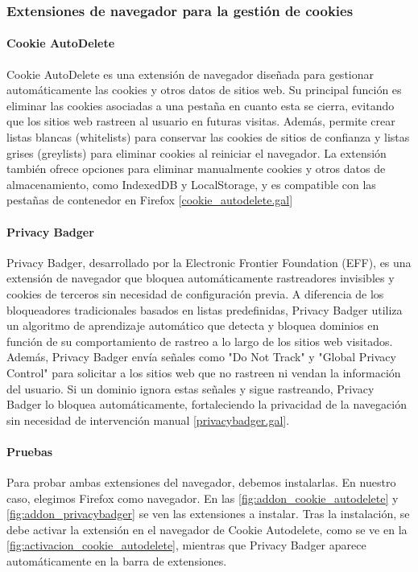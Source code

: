 \subsubsection{Extensiones de navegador para la gestión de cookies}

\paragraph{Cookie AutoDelete}

Cookie AutoDelete es una extensión de navegador diseñada para gestionar automáticamente las cookies y otros datos de sitios web. Su principal función es eliminar las cookies asociadas a una pestaña en cuanto esta se cierra, evitando que los sitios web rastreen al usuario en futuras visitas. Además, permite crear listas blancas (whitelists) para conservar las cookies de sitios de confianza y listas grises (greylists) para eliminar cookies al reiniciar el navegador. La extensión también ofrece opciones para eliminar manualmente cookies y otros datos de almacenamiento, como IndexedDB y LocalStorage, y es compatible con las pestañas de contenedor en Firefox [\url{cookie_autodelete.gal}]

\paragraph{Privacy Badger}

Privacy Badger, desarrollado por la Electronic Frontier Foundation (EFF), es una extensión de navegador que bloquea automáticamente rastreadores invisibles y cookies de terceros sin necesidad de configuración previa. A diferencia de los bloqueadores tradicionales basados en listas predefinidas, Privacy Badger utiliza un algoritmo de aprendizaje automático que detecta y bloquea dominios en función de su comportamiento de rastreo a lo largo de los sitios web visitados. Además, Privacy Badger envía señales como "Do Not Track" y "Global Privacy Control" para solicitar a los sitios web que no rastreen ni vendan la información del usuario. Si un dominio ignora estas señales y sigue rastreando, Privacy Badger lo bloquea automáticamente, fortaleciendo la privacidad de la navegación sin necesidad de intervención manual [\url{privacybadger.gal}]. 

\paragraph{Pruebas}

Para probar ambas extensiones del navegador, debemos instalarlas. En nuestro caso, elegimos Firefox como navegador. En las \ref{fig:addon_cookie_autodelete} y \ref{fig:addon_privacybadger} se ven las extensiones a instalar. Tras la instalación, se debe activar la extensión en el navegador de Cookie Autodelete, como se ve en la \ref{fig:activacion_cookie_autodelete}, mientras que Privacy Badger aparece automáticamente en la barra de extensiones. 

